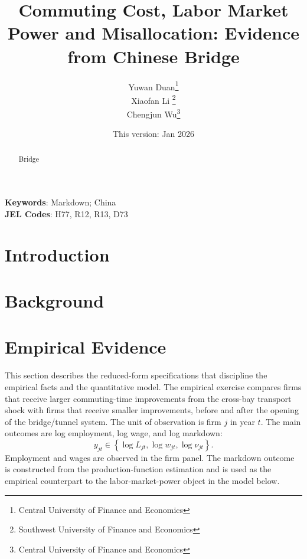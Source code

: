 \documentclass[12pt]{article}
\begin{document}
 \title{\Large{Commuting Cost, Labor Market Power and Misallocation: Evidence from Chinese Bridge}}
\author{ Yuwan Duan\footnote{Central University of Finance and Economics}\\ Xiaofan Li \footnote{Southwest University of Finance and Economics} \\ Chengjun Wu\footnote{Central University of Finance and Economics}}
\date{\vspace{0.1in} \small{This version: Jan 2026}}
\maketitle
\thispagestyle{empty}%
\vspace{-0.2in}\begin{abstract}
\noindent 
Bridge 
\end{abstract}
\vspace{0.0in}

\begin{small}
\noindent 
\textbf{Keywords}:  
Markdown; China \\
\textbf{JEL Codes}: H77, R12, R13, D73
\end{small} 
\vspace{0.1in}

\pagebreak



\section{Introduction}
\section{Background}
\section{Empirical Evidence}
This section describes the reduced-form specifications that discipline the empirical facts and the quantitative model. The empirical exercise compares firms that receive larger commuting-time improvements from the cross-bay transport shock with firms that receive smaller improvements, before and after the opening of the bridge/tunnel system. The unit of observation is firm \(j\) in year \(t\). The main outcomes are log employment, log wage, and log markdown:
\[
    y_{jt}\in\left\{\log L_{jt},\log w_{jt},\log \nu_{jt}\right\}.
\]
Employment and wages are observed in the firm panel. The markdown outcome is constructed from the production-function estimation and is used as the empirical counterpart to the labor-market-power object in the model below.
\end{document}
